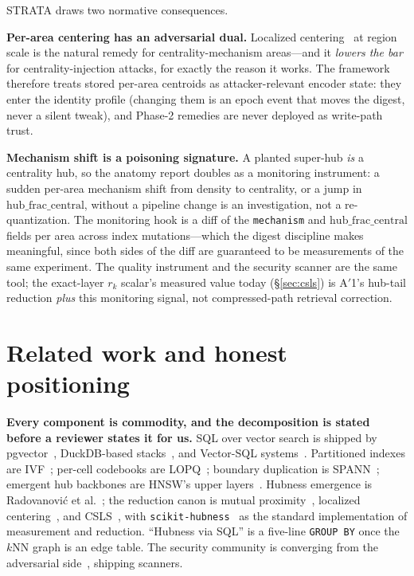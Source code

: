 \documentclass[sigconf, nonacm]{acmart}
\begin{document}
STRATA draws two normative consequences.

\textbf{Per-area centering has an adversarial dual.} Localized
centering~\cite{hara2015localized} at region scale is the natural remedy
for centrality-mechanism areas---and it \emph{lowers the bar} for
centrality-injection attacks, for exactly the reason it works. The
framework therefore treats stored per-area centroids as attacker-relevant
encoder state: they enter the identity profile (changing them is an epoch
event that moves the digest, never a silent tweak), and Phase-2 remedies
are never deployed as write-path trust.

\textbf{Mechanism shift is a poisoning signature.} A planted super-hub
\emph{is} a centrality hub, so the anatomy report doubles as a monitoring
instrument: a sudden per-area mechanism shift from density to centrality,
or a jump in $\mathrm{hub\_frac\_central}$, without a pipeline change is
an investigation, not a re-quantization. The monitoring hook is a diff of
the \texttt{mechanism} and $\mathrm{hub\_frac\_central}$ fields per area
across index mutations---which the digest discipline makes meaningful,
since both sides of the diff are guaranteed to be measurements of the same
experiment. The quality instrument and the security scanner are the same
tool; the exact-layer $r_k$ scalar's measured value today
(\S\ref{sec:csls}) is A$'$1's hub-tail reduction \emph{plus} this
monitoring signal, not compressed-path retrieval correction.

\section{Related work and honest positioning}
\label{sec:related}

\textbf{Every component is commodity, and the decomposition is stated
before a reviewer states it for us.} SQL over vector search is shipped by
pgvector~\cite{pgvector2023}, DuckDB-based
stacks~\cite{raasveldt2019duckdb}, and Vector-SQL
systems~\cite{TODO-myscale-vectorsql}. Partitioned indexes are
IVF~\cite{jegou2011product,johnson2019faiss}; per-cell codebooks are
LOPQ~\cite{kalantidis2014lopq}; boundary duplication is
SPANN~\cite{chen2021spann}; emergent hub backbones are HNSW's upper
layers~\cite{malkov2020hnsw}. Hubness emergence is Radovanovi\'c et
al.~\cite{radovanovic2010hubs}; the reduction canon is mutual
proximity~\cite{schnitzer2012mutual}, localized
centering~\cite{hara2015localized}, and CSLS~\cite{conneau2018word}, with
\texttt{scikit-hubness}~\cite{feldbauer2020scikithubness} as the standard
implementation of measurement and reduction. ``Hubness via SQL'' is a
five-line \texttt{GROUP BY} once the $k$NN graph is an edge table. The
security community is converging from the adversarial
side~\cite{blackhole2026,advhubness2026}, shipping scanners.
\end{document}
